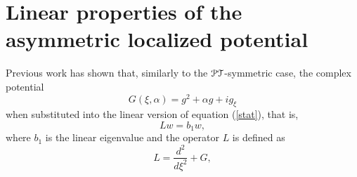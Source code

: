 \documentclass[aps,pre,showpacs,twocolumn]{revtex4}
\newcommand{\PT}{{\cal PT}}
\begin{document}
\section{Linear properties of the asymmetric localized potential}
Previous work \cite{Yang2016} has shown that, similarly to the $\PT$-symmetric case, the complex potential
\begin{equation}
G(\xi,\alpha)=g^2+\alpha g +ig_\xi
\end{equation}
when substituted into the linear version of equation (\ref{stat}), that is, 
\begin{equation}
Lw=b_1w,
\label{npt_linear}
\end{equation}
where $b_1$ is the linear eigenvalue and the operator $L$ is defined as 
\begin{equation}
L=\frac{d^2}{d\xi^2}+G,
\label{lineareqs}
\end{equation}
\end{document}
